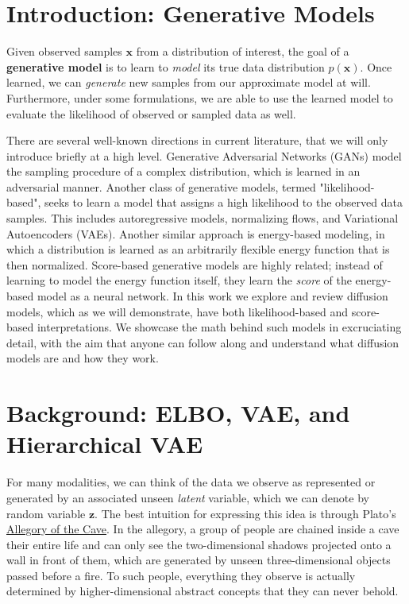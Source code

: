 
\section{Introduction: Generative Models}
Given observed samples $\bm{x}$ from a distribution of interest, the goal of a \textbf{generative model} is to learn to \textit{model} its true data distribution $p(\bm{x})$.  Once learned, we can \textit{generate} new samples from our approximate model at will.  Furthermore, under some formulations, we are able to use the learned model to evaluate the likelihood of observed or sampled data as well.

There are several well-known directions in current literature, that we will only introduce briefly at a high level.  Generative Adversarial Networks (GANs) model the sampling procedure of a complex distribution, which is learned in an adversarial manner.  Another class of generative models, termed "likelihood-based", seeks to learn a model that assigns a high likelihood to the observed data samples.  This includes autoregressive models, normalizing flows, and Variational Autoencoders (VAEs).  Another similar approach is energy-based modeling, in which a distribution is learned as an arbitrarily flexible energy function that is then normalized.  Score-based generative models are highly related; instead of learning to model the energy function itself, they learn the \textit{score} of the energy-based model as a neural network.  In this work we explore and review diffusion models, which as we will demonstrate, have both likelihood-based and score-based interpretations.  We showcase the math behind such models in excruciating detail, with the aim that anyone can follow along and understand what diffusion models are and how they work.

\section*{Background: ELBO, VAE, and Hierarchical VAE}
%

For many modalities, we can think of the data we observe as represented or generated by an associated unseen \textit{latent} variable, which we can denote by random variable $\bm{z}$.  The best intuition for expressing this idea is through Plato's \href{https://en.wikipedia.org/wiki/Allegory_of_the_cave}{Allegory of the Cave}.  In the allegory, a group of people are chained inside a cave their entire life and can only see the two-dimensional shadows projected onto a wall in front of them, which are generated by unseen three-dimensional objects passed before a fire.  To such people, everything they observe is actually determined by higher-dimensional abstract concepts that they can never behold.

